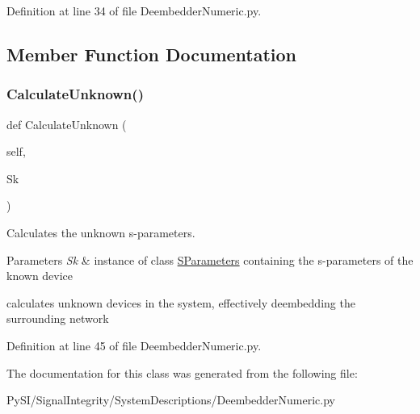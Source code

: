 Definition at line 34 of file Deembedder\+Numeric.\+py.



\subsection{Member Function Documentation}
\mbox{\label{classSignalIntegrity_1_1SystemDescriptions_1_1DeembedderNumeric_1_1DeembedderNumeric_a35720c536433da8712e515f3c4d6ecf6}} 
\subsubsection{\texorpdfstring{Calculate\+Unknown()}{CalculateUnknown()}}
{\footnotesize\ttfamily def Calculate\+Unknown (\begin{DoxyParamCaption}\item[{}]{self,  }\item[{}]{Sk }\end{DoxyParamCaption})}



Calculates the unknown s-\/parameters. 


\begin{DoxyParams}{Parameters}
{\em Sk} & instance of class \hyperlink{namespaceSignalIntegrity_1_1SParameters}{S\+Parameters} containing the s-\/parameters of the known device\\
\hline
\end{DoxyParams}
calculates unknown devices in the system, effectively deembedding the surrounding network 

Definition at line 45 of file Deembedder\+Numeric.\+py.



The documentation for this class was generated from the following file\+:\begin{DoxyCompactItemize}
\item 
Py\+S\+I/\+Signal\+Integrity/\+System\+Descriptions/Deembedder\+Numeric.\+py\end{DoxyCompactItemize}
